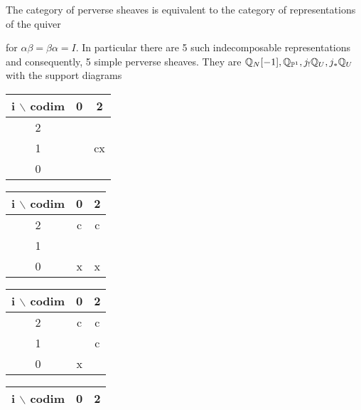 \documentclass[12pt]{article}
\begin{document}
\begin{example}
    The category of perverse sheaves is equivalent to the category of representations
    of the quiver \begin{center}
    \end{center} for $\alpha\beta = \beta\alpha = I$.
    In particular there are 5 such indecomposable representations and consequently,
    5 simple perverse sheaves. They are
    $\mathbb{Q}_N[-1],\mathbb{Q}_{\mathbb{P}^1},j_!\mathbb{Q}_U, j_*\mathbb{Q}_U$ with the support diagrams
    \begin{center}
        \begin{tabular}{|c|c|c|}
            \hline
            i $\backslash$ codim & 0 & 2  \\
            \hline
            2                    &   &    \\
            \hline
            1                    &   & cx \\
            \hline
            0                    &   &    \\
            \hline
        \end{tabular}
        \begin{tabular}{|c|c|c|}
            \hline
            i $\backslash$ codim & 0 & 2 \\
            \hline
            2                    & c & c \\
            \hline
            1                    &   &   \\
            \hline
            0                    & x & x \\
            \hline
        \end{tabular}
        \begin{tabular}{|c|c|c|}
            \hline
            i $\backslash$ codim & 0 & 2 \\
            \hline
            2                    & c & c \\
            \hline
            1                    &   & c \\
            \hline
            0                    & x &   \\
            \hline
        \end{tabular}
        \begin{tabular}{|c|c|c|}
            \hline
            i $\backslash$ codim & 0 & 2 \\
            \hline

\end{tabular}
\end{center}
\end{example}
\end{document}
